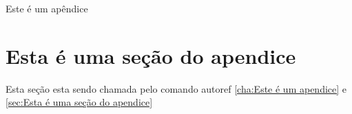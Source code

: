 Este é um apêndice
\section{Esta é uma seção do apendice} %
\label{sec:Esta é uma seção do apendice}
Esta seção esta sendo chamada pelo comando autoref \autoref{cha:Este é um apendice} e \autoref{sec:Esta é uma seção do apendice}
